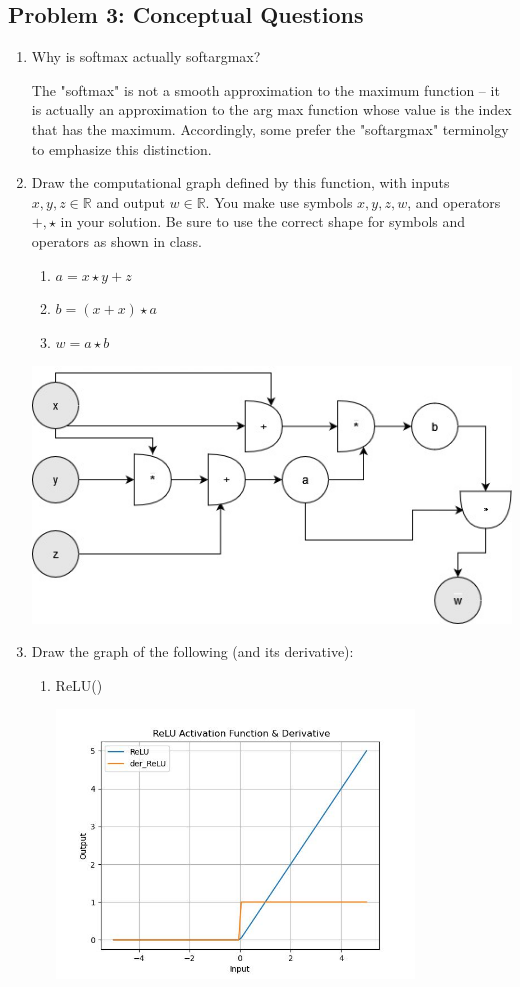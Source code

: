 \documentclass{article}
\begin{document}
\subsection*{Problem 3: Conceptual Questions}
%
\begin{enumerate}
  \item Why is softmax actually softargmax?
        \begin{tcolorbox}
          The "softmax" is not a smooth approximation to the maximum function -- it
          is actually an approximation to the arg max function whose value is the index
          that has the maximum. Accordingly, some prefer the "softargmax" terminolgy to
          emphasize this distinction.
        \end{tcolorbox}
  \item Draw the computational graph defined by this function, with inputs $x,
          y, z \in \mathbb{R}$ and output $w \in \mathbb{R}$. You make use symbols $x, y,
          z,w$, and operators $+,\star$ in your solution. Be sure to use the correct
        shape for symbols and
        operators as shown in class.
        \begin{enumerate}
          \item $a = x \star y + z  $
          \item $b = (x+x) \star a$
          \item $w = a \star b$
        \end{enumerate}
        \includegraphics[width=15cm]{"diagram.jpg"}
  \item Draw the graph of the following (and its derivative):
        \begin{enumerate}
          \item ReLU()
                \begin{tcolorbox}
                  \includegraphics[width=9.5cm]{relu.jpg}

\end{tcolorbox}
\end{enumerate}
\end{enumerate}
\end{document}
